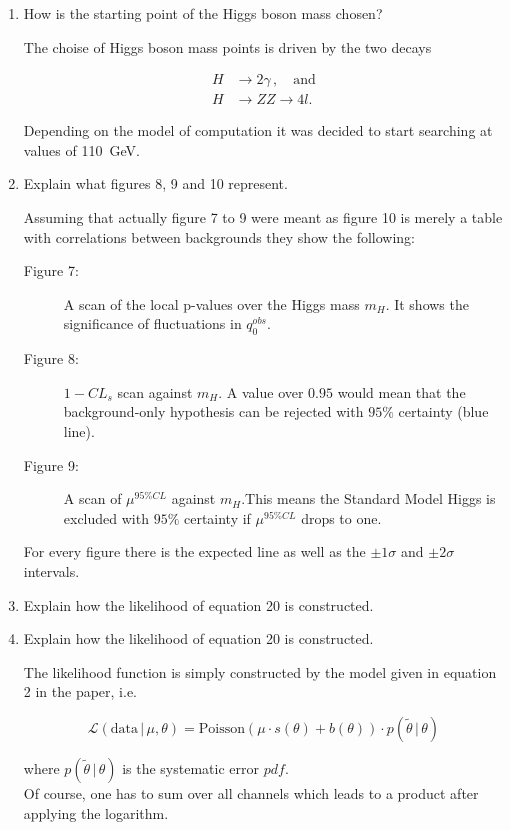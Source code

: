 \documentclass[10pt]{article}
\newenvironment{myfont}{\fontfamily{put}\selectfont}{\par}
\begin{document}
\begin{myfont}
\begin{enumerate}[label = \textbf{\roman*}.]
  \item How is the starting point of the Higgs boson mass chosen?

  \noindent The choise of Higgs boson mass points is driven by the two decays

  \begin{align*}
  	H & \rightarrow 2\gamma \, , \quad \textrm{and} \\
  	H & \rightarrow ZZ \rightarrow 4l.
  \end{align*}

  \noindent Depending on the model of computation it was decided to start searching at values of \SI{110}{\giga\electronvolt}.

  \item Explain what figures 8, 9 and 10 represent.

  \noindent
  Assuming that actually figure 7 to 9 were meant as figure 10 is merely a table with correlations between backgrounds they show the following:
  
  \begin{description}
    \item[Figure 7:] A scan of the local p-values over the Higgs mass $m_H$. It shows the significance of fluctuations in $q_0^{obs}$.
    \item[Figure 8:] $1-CL_s$ scan against $m_H$. A value over $0.95$ would mean that the background-only hypothesis can be rejected with $95\%$ certainty (blue line).
    \item[Figure 9:] A scan of $\mu^{95\%CL}$ against $m_H$.This means the Standard Model Higgs is excluded with $95\%$ certainty if $\mu^{95\%CL}$ drops to one. 
  \end{description}
    For every figure there is the expected line as well as the $\pm 1 \sigma$ and $\pm 2 \sigma$ intervals.
  \item Explain how the likelihood of equation 20 is constructed.

  \item Explain how the likelihood of equation 20 is constructed.

  \noindent The likelihood function is simply constructed by the model given in equation 2 in the paper, i.e.

  \begin{equation}
  	\mathcal{L}\left(\textrm{data}\,|\,\mu, \theta\right) = \textrm{Poisson}\left(\mu \cdot s(\theta) + b(\theta)\right) \cdot p(\tilde{\theta}\, | \, \theta)
  \end{equation}

  \noindent where $p(\tilde{\theta}\,|\,\theta)$ is the systematic error $pdf$. \\
  Of course, one has to sum over all channels which leads to a product after applying the logarithm.
\end{enumerate}


\end{myfont}
\end{document}
